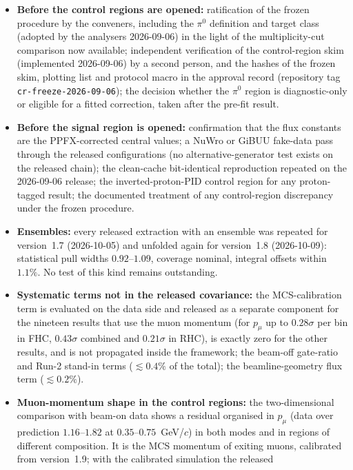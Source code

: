 \begin{itemize}\itemsep2pt
  \item \textbf{Before the control regions are opened:} ratification of the frozen
    procedure by the conveners, including the $\pi^0$ definition and target class
    (adopted by the analysers 2026-09-06) in the light of the multiplicity-cut comparison
    now available; independent verification of the
    control-region skim (implemented 2026-09-06) by a second person, and the hashes of
    the frozen skim, plotting list and protocol macro in the approval record (repository
    tag \texttt{cr-freeze-2026-09-06}); the decision whether the $\pi^0$ region is
    diagnostic-only or eligible for a fitted correction, taken after the pre-fit result.
  \item \textbf{Before the signal region is opened:} confirmation that the flux constants
    are the PPFX-corrected central values; a NuWro or GiBUU fake-data pass through the
    released configurations (no alternative-generator test exists on the released chain);
    the clean-cache bit-identical reproduction repeated on the 2026-09-06 release; the inverted-proton-PID
    control region for any proton-tagged result; the documented treatment of any
    control-region discrepancy under the frozen procedure.
  \item \textbf{Ensembles:} every released extraction with an ensemble was repeated for version~1.7
    (2026-10-05) and unfolded again for version~1.8 (2026-10-09): statistical pull widths $0.92$--$1.09$,
    coverage nominal, integral offsets within $1.1\%$. No test of this kind remains outstanding.
  \item \textbf{Systematic terms not in the released covariance:} the MCS-calibration
    term is evaluated on the data side and released as a separate component for the nineteen results that
    use the muon momentum (for $p_\mu$ up to $0.28\sigma$ per bin in FHC, $0.43\sigma$ combined and
    $0.21\sigma$ in RHC), is exactly zero for the other results, and is not propagated
    inside the framework; the beam-off gate-ratio and Run-2 stand-in terms ($\lesssim0.4\%$
    of the total); the beamline-geometry flux term ($\lesssim0.2\%$).
  \item \textbf{Muon-momentum shape in the control regions:} the two-dimensional comparison with
    beam-on data shows a residual organised in $p_\mu$ (data over prediction $1.16$--$1.82$ at
    $0.35$--$0.75$~GeV/$c$) in both modes and in regions of different composition. It is the MCS
    momentum of exiting muons, calibrated from version~1.9; with the calibrated simulation the released

\end{itemize}
